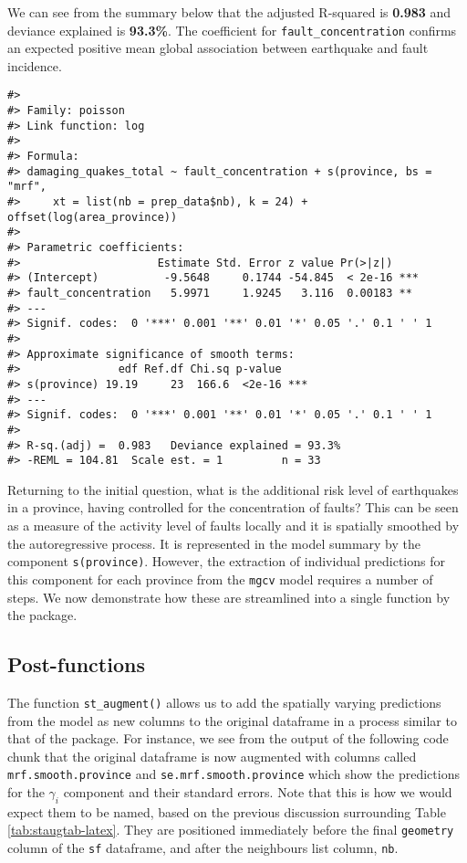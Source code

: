 We can see from the summary below that the adjusted R-squared is \textbf{0.983} and deviance explained is \textbf{93.3\%}. The coefficient for \texttt{fault\_concentration} confirms an expected positive mean global association between earthquake and fault incidence.

\begin{verbatim}
#> 
#> Family: poisson 
#> Link function: log 
#> 
#> Formula:
#> damaging_quakes_total ~ fault_concentration + s(province, bs = "mrf", 
#>     xt = list(nb = prep_data$nb), k = 24) + offset(log(area_province))
#> 
#> Parametric coefficients:
#>                     Estimate Std. Error z value Pr(>|z|)    
#> (Intercept)          -9.5648     0.1744 -54.845  < 2e-16 ***
#> fault_concentration   5.9971     1.9245   3.116  0.00183 ** 
#> ---
#> Signif. codes:  0 '***' 0.001 '**' 0.01 '*' 0.05 '.' 0.1 ' ' 1
#> 
#> Approximate significance of smooth terms:
#>               edf Ref.df Chi.sq p-value    
#> s(province) 19.19     23  166.6  <2e-16 ***
#> ---
#> Signif. codes:  0 '***' 0.001 '**' 0.01 '*' 0.05 '.' 0.1 ' ' 1
#> 
#> R-sq.(adj) =  0.983   Deviance explained = 93.3%
#> -REML = 104.81  Scale est. = 1         n = 33
\end{verbatim}

Returning to the initial question, what is the additional risk level of earthquakes in a province, having controlled for the concentration of faults? This can be seen as a measure of the activity level of faults locally and it is spatially smoothed by the autoregressive process. It is represented in the model summary by the component \texttt{s(province)}. However, the extraction of individual predictions for this component for each province from the \texttt{mgcv} model requires a number of steps. We now demonstrate how these are streamlined into a single function by the  package.

\subsection{Post-functions}\label{post-functions-1}

The function \texttt{st\_augment()} allows us to add the spatially varying predictions from the model as new columns to the original dataframe in a process
similar to that of the  package. For instance, we see from the output of the following code chunk that the original dataframe is now augmented with columns called \texttt{mrf.smooth.province} and \texttt{se.mrf.smooth.province} which show the predictions for the \(\gamma_i\) component and their standard errors. Note that this is how we would expect them to be named, based on the previous discussion surrounding Table \ref{tab:staugtab-latex}. They are positioned immediately before the final \texttt{geometry} column of the \texttt{sf} dataframe, and after the neighbours list column, \texttt{nb}.

